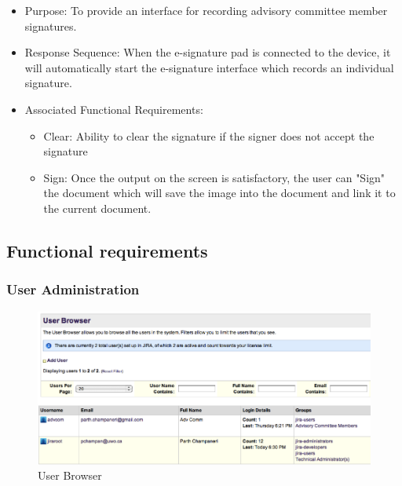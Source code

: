 \documentclass{journal}
\begin{document}
\begin{itemize}
\item Purpose: To provide an interface for recording advisory committee member signatures.
\item Response Sequence: When the e-signature pad is connected to the device, it will automatically start the e-signature interface which records an individual signature.
\item Associated Functional Requirements:
\begin{itemize}
\item Clear: Ability to clear the signature if the signer does not accept the signature
\item Sign: Once the output on the screen is satisfactory, the user can "Sign" the document which will save the image into the document and link it to the current document.
\end{itemize}
\end{itemize}
\subsection{Functional requirements}
\subsubsection{User Administration}

\begin{figure}[htp]
\centering
\includegraphics[scale=1]{diagrams/HTMLTemplating/Figure7.png}
\caption{User Browser}
\label{fig:UserBrowser}
\end{figure}
\end{document}
